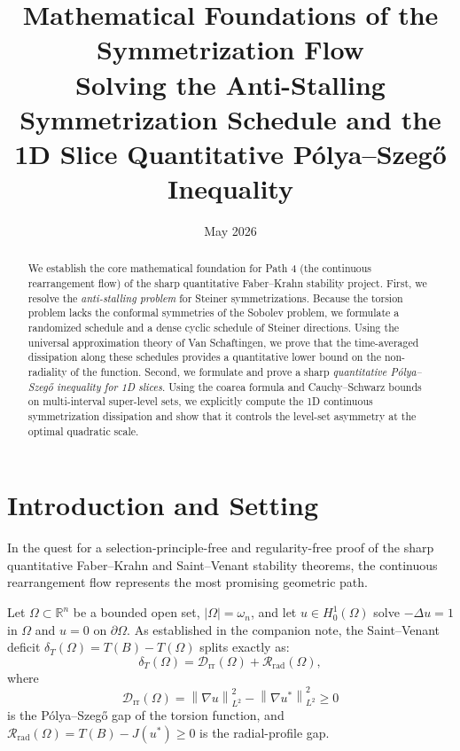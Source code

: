 \documentclass[11pt]{article}
\title{Mathematical Foundations of the Symmetrization Flow\\
       \large Solving the Anti-Stalling Symmetrization Schedule and the 1D Slice Quantitative Pólya--Szegő Inequality}
\author{}
\date{May 2026}
\theoremstyle{definition}
\newcommand{\R}{\mathbb R}
\newcommand{\Om}{\Omega}
\newcommand{\Drr}{\mathcal D_{\mathrm{rr}}}
\newcommand{\Rrad}{\mathcal R_{\mathrm{rad}}}
\newcommand{\dT}{\delta_T}
\newcommand{\norm}[1]{\left\|#1\right\|}
\begin{document}
\maketitle

\begin{abstract}
We establish the core mathematical foundation for Path 4 (the continuous rearrangement flow) of the sharp quantitative Faber--Krahn stability project. First, we resolve the \emph{anti-stalling problem} for Steiner symmetrizations. Because the torsion problem lacks the conformal symmetries of the Sobolev problem, we formulate a randomized schedule and a dense cyclic schedule of Steiner directions. Using the universal approximation theory of Van Schaftingen, we prove that the time-averaged dissipation along these schedules provides a quantitative lower bound on the non-radiality of the function. Second, we formulate and prove a sharp \emph{quantitative Pólya--Szegő inequality for 1D slices}. Using the coarea formula and Cauchy--Schwarz bounds on multi-interval super-level sets, we explicitly compute the 1D continuous symmetrization dissipation and show that it controls the level-set asymmetry at the optimal quadratic scale.
\end{abstract}

\tableofcontents

\newpage

\section{Introduction and Setting}

In the quest for a selection-principle-free and regularity-free proof of the sharp quantitative Faber--Krahn and Saint--Venant stability theorems, the continuous rearrangement flow represents the most promising geometric path. 

Let $\Om \subset \R^n$ be a bounded open set, $|\Om| = \omega_n$, and let $u \in H^1_0(\Om)$ solve $-\Delta u = 1$ in $\Om$ and $u=0$ on $\partial\Om$. As established in the companion note, the Saint--Venant deficit $\dT(\Om) = T(B) - T(\Om)$ splits exactly as:
\begin{equation}
\dT(\Om) = \Drr(\Om) + \Rrad(\Om),
\end{equation}
where
\begin{equation}
\Drr(\Om) = \norm{\nabla u}_{L^2}^2 - \norm{\nabla u^*}_{L^2}^2 \ge 0
\end{equation}
is the Pólya--Szegő gap of the torsion function, and $\Rrad(\Om) = T(B) - J(u^*) \ge 0$ is the radial-profile gap.
\end{document}
